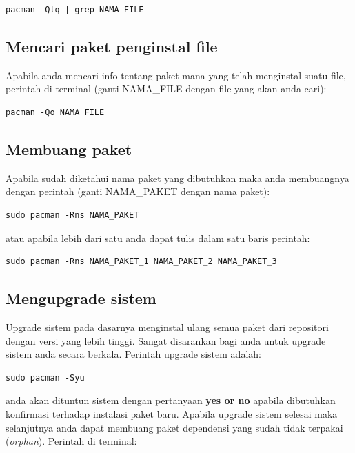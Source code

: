 \documentclass[12pt,]{article}
\begin{document}
	\begin{verbatim}
pacman -Qlq | grep NAMA_FILE
	\end{verbatim}
	
	\subsection{Mencari paket penginstal file}
	Apabila anda mencari info tentang paket mana yang telah menginstal suatu file,
	perintah di terminal (ganti NAMA\_FILE dengan file yang akan anda cari):
	
	\begin{verbatim}
pacman -Qo NAMA_FILE
	\end{verbatim}
	
	\subsection{Membuang paket}
	
	Apabila sudah diketahui nama paket yang dibutuhkan maka anda membuangnya dengan perintah
	(ganti NAMA\_PAKET dengan nama paket):
	
	\begin{verbatim}
sudo pacman -Rns NAMA_PAKET
	\end{verbatim}
	
	atau apabila lebih dari satu anda dapat tulis dalam satu baris perintah:
	
	\begin{verbatim}
sudo pacman -Rns NAMA_PAKET_1 NAMA_PAKET_2 NAMA_PAKET_3
	\end{verbatim}
	
	\subsection{Mengupgrade sistem}
	
	Upgrade sistem pada dasarnya menginstal ulang semua paket dari repositori dengan versi yang lebih tinggi.
	Sangat disarankan bagi anda untuk upgrade sistem anda secara berkala.
	Perintah upgrade sistem adalah:
	
	\begin{verbatim}
sudo pacman -Syu
	\end{verbatim}
	
	anda akan dituntun sistem dengan pertanyaan \textbf{yes or no} apabila dibutuhkan konfirmasi terhadap instalasi paket baru.
	Apabila upgrade sistem selesai maka selanjutnya anda dapat membuang paket dependensi yang sudah tidak terpakai (\textit{orphan}).
	Perintah di terminal:
	
\end{document}
